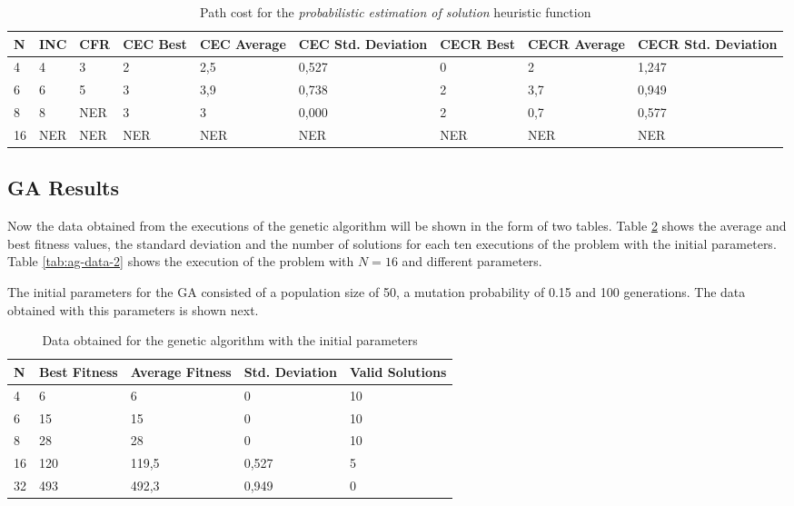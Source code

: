 \documentclass[]{llncs}
\begin{document}
\begin{table}[H]
    \caption{Path cost for the \textit{probabilistic estimation of solution} heuristic function}
    \centering
    \label{tab:probestimation-pathcost}
    \resizebox{1 \textwidth}{!} { %
        \begin{tabular}{|l|l|l|l|l|l|l|l|l|}
            \hline
            N & INC & CFR & CEC Best & CEC Average & CEC Std. Deviation & CECR Best & CECR Average & CECR Std. Deviation \\ \hline
            4 & 4 & 3 & 2 & 2,5 & 0,527 & 0 & 2 & 1,247 \\
            6 & 6 & 5 & 3 & 3,9 & 0,738 & 2 & 3,7 & 0,949 \\
            8 & 8 & NER & 3 & 3 & 0,000 & 2 & 0,7 &	0,577 \\
            16 & NER & NER & NER & NER  & NER & NER & NER  & NER \\ \hline        
        \end{tabular}
        } %
\end{table}
\subsection{GA Results}\label{gen_results}
Now the data obtained from the executions of the genetic algorithm will be shown in the form of two tables. Table \ref{tab:ag-data}  shows the average and best fitness values, the standard deviation and the number of solutions for each ten executions of the problem with the initial parameters. Table \ref{tab:ag-data-2} shows the execution of the problem with $N=16$ and different parameters.

The initial parameters for the GA consisted of a population size of 50, a mutation probability of 0.15 and 100 generations. The data obtained with this parameters is shown next.

\begin{table}[H]
    \caption{Data obtained for the genetic algorithm with the initial parameters}
    \centering
    \begin{tabular}{|l|l|l|l|l|}
        \hline
        N  & Best Fitness & Average Fitness & Std. Deviation & Valid Solutions      \\ \hline
        4  & 6            & 6               & 0              & 10                   \\
        6  & 15           & 15              & 0              & 10                   \\
        8  & 28           & 28              & 0              & 10                   \\
        16 & 120          & 119,5           & 0,527          & 5                    \\
        32 & 493          & 492,3           & 0,949          & 0                    \\ \hline
    \end{tabular}
    \label{tab:ag-data}
\end{table}
\end{document}
